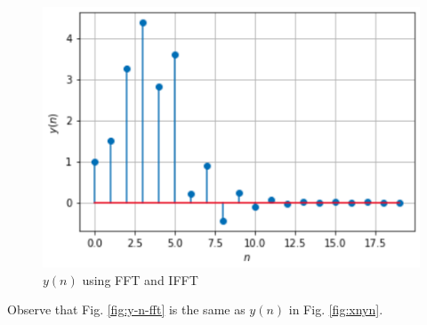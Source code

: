\documentclass[journal,12pt,twocolumn]{IEEEtran}
\renewcommand\thesection{\arabic{section}}
\begin{document}
\begin{enumerate}[label=\thesection.\arabic*]
\begin{figure}
	\centering
	\includegraphics[width=\columnwidth]{figs/Ex_6.4.png}
	\caption{$y(n)$ using FFT and IFFT}
	\label{fig:y-n-fft}
\end{figure}

Observe that Fig. \eqref{fig:y-n-fft} is the same as $y(n)$ in Fig. \eqref{fig:xnyn}.
\end{enumerate}
%
\end{document}
